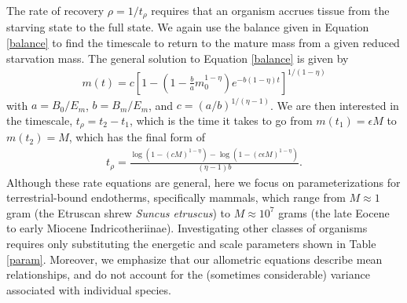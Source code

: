 \documentclass{pnastwo}
\begin{document}
\begin{article}

The rate of recovery $\rho = 1/t_\rho$ requires that an organism accrues tissue from the starving state to the full state.
We again use the balance given in Equation \ref{balance} to find the timescale to return to the mature mass from a given reduced starvation mass. The general solution to Equation \ref{balance} is given by
\begin{eqnarray}
m\left(t\right)=c\left[1-\left(1-\frac{b}{a}m_{0}^{1-\eta}\right)e^{-b\left(1-\eta\right)t}\right]^{1/\left(1-\eta\right)}%
\end{eqnarray}
with $a=B_{0}/E_{m}$, $b=B_{m}/E_{m}$, and $c=(a/b)^{1/(\eta-1)}$. We are then interested in the timescale, $t_{\rho}=t_{2}-t_{1}$, which is the time it takes to go from $m\left(t_{1}\right)=\epsilon M$ to $m\left(t_{2}\right)=M$, which has the final form of 
\begin{eqnarray}
t_{\rho}=\frac{\log \left(1-\left(cM \right)^{1-\eta }\right)-\log \left(1-\left(c\epsilon M \right)^{1-\eta }\right)}{(\eta -1) b}.
\end{eqnarray}
Although these rate equations are general, here we focus on parameterizations for terrestrial-bound endotherms, specifically mammals, which range from $M\approx1$ gram (the Etruscan shrew \emph{Suncus etruscus}) to $M\approx10^7$ grams (the late Eocene to early Miocene Indricotheriinae).
Investigating other classes of organisms requires only substituting the energetic and scale parameters shown in Table \ref{param}.
Moreover, we emphasize that our allometric equations describe mean relationships, and do not account for the (sometimes considerable) variance associated with individual species. 





\end{article}
\end{document}
